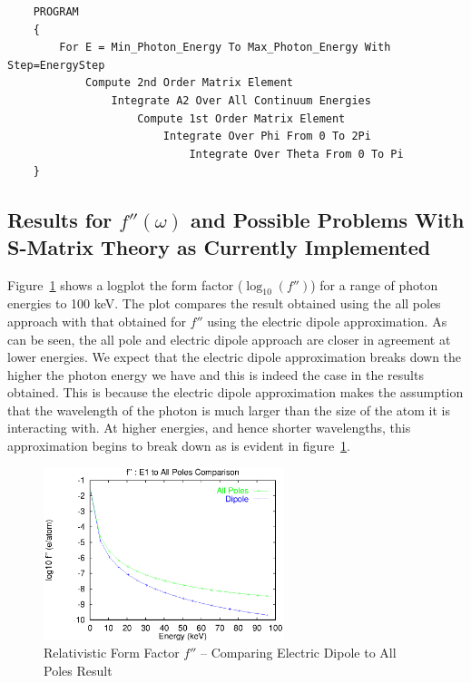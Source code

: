  \begin{verbatim} 
    PROGRAM
    {
        For E = Min_Photon_Energy To Max_Photon_Energy With Step=EnergyStep
            Compute 2nd Order Matrix Element
                Integrate A2 Over All Continuum Energies 
                    Compute 1st Order Matrix Element
                        Integrate Over Phi From 0 To 2Pi 
                            Integrate Over Theta From 0 To Pi
    } 
\end{verbatim}


\subsection{Results for $f''(\omega)$ and
            Possible Problems With S-Matrix Theory as Currently Implemented}
Figure~\ref{fig:compare-poles} shows a logplot the form factor ($\log_{10}(f'')$)
for a range of photon energies to 100 keV. The plot compares the result obtained
using the all poles approach with that obtained for $f''$ using the electric
dipole approximation. As can be seen, the all pole and electric dipole approach
are closer in agreement at lower energies. We expect that the electric dipole
approximation breaks down the higher the photon energy we have and this is
indeed the case in the results obtained. This is because the electric dipole
approximation makes the assumption that the wavelength of the photon is much
larger than the size of the atom it is interacting with. At higher energies,
and hence shorter wavelengths, this approximation begins to break down as
is evident in figure~\ref{fig:compare-poles}.
\begin{figure}[h]
\begin{center}
    \includegraphics[width=7cm]{compare_poles_1.eps}
\end{center}
    \caption{Relativistic Form Factor $f''$ -- Comparing Electric Dipole 
            to All Poles Result}
    \label{fig:compare-poles}
\end{figure}
